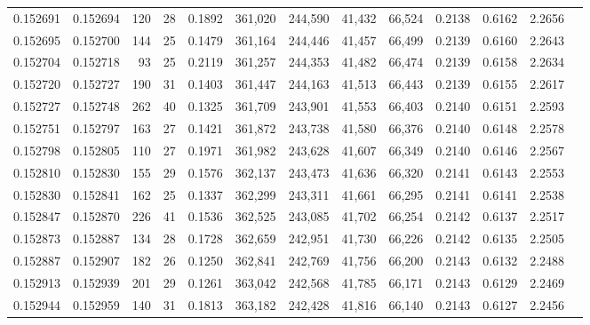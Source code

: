 \begin{tabular}{rrrrrrrrrrrrr}
0.152691 & 0.152694 &   120 &  28 &                                     0.1892 & 361,020 & 244,590 &  41,432 &  66,524 & 0.2138 & 0.6162 & 2.2656 \\
0.152695 & 0.152700 &   144 &  25 &                                     0.1479 & 361,164 & 244,446 &  41,457 &  66,499 & 0.2139 & 0.6160 & 2.2643 \\
0.152704 & 0.152718 &    93 &  25 &                                     0.2119 & 361,257 & 244,353 &  41,482 &  66,474 & 0.2139 & 0.6158 & 2.2634 \\
0.152720 & 0.152727 &   190 &  31 &                                     0.1403 & 361,447 & 244,163 &  41,513 &  66,443 & 0.2139 & 0.6155 & 2.2617 \\
0.152727 & 0.152748 &   262 &  40 &                                     0.1325 & 361,709 & 243,901 &  41,553 &  66,403 & 0.2140 & 0.6151 & 2.2593 \\
0.152751 & 0.152797 &   163 &  27 &                                     0.1421 & 361,872 & 243,738 &  41,580 &  66,376 & 0.2140 & 0.6148 & 2.2578 \\
0.152798 & 0.152805 &   110 &  27 &                                     0.1971 & 361,982 & 243,628 &  41,607 &  66,349 & 0.2140 & 0.6146 & 2.2567 \\
0.152810 & 0.152830 &   155 &  29 &                                     0.1576 & 362,137 & 243,473 &  41,636 &  66,320 & 0.2141 & 0.6143 & 2.2553 \\
0.152830 & 0.152841 &   162 &  25 &                                     0.1337 & 362,299 & 243,311 &  41,661 &  66,295 & 0.2141 & 0.6141 & 2.2538 \\
0.152847 & 0.152870 &   226 &  41 &                                     0.1536 & 362,525 & 243,085 &  41,702 &  66,254 & 0.2142 & 0.6137 & 2.2517 \\
0.152873 & 0.152887 &   134 &  28 &                                     0.1728 & 362,659 & 242,951 &  41,730 &  66,226 & 0.2142 & 0.6135 & 2.2505 \\
0.152887 & 0.152907 &   182 &  26 &                                     0.1250 & 362,841 & 242,769 &  41,756 &  66,200 & 0.2143 & 0.6132 & 2.2488 \\
0.152913 & 0.152939 &   201 &  29 &                                     0.1261 & 363,042 & 242,568 &  41,785 &  66,171 & 0.2143 & 0.6129 & 2.2469 \\
0.152944 & 0.152959 &   140 &  31 &                                     0.1813 & 363,182 & 242,428 &  41,816 &  66,140 & 0.2143 & 0.6127 & 2.2456 \\

\end{tabular}

